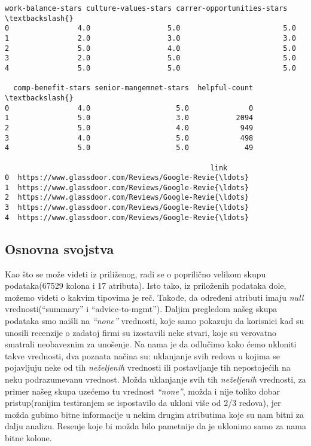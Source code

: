 \documentclass[11pt]{article}
\begin{document}
\begin{tcolorbox}[breakable, size=fbox, boxrule=.5pt, pad at break*=1mm, opacityfill=0]
\begin{Verbatim}[commandchars=\\\{\}]
  work-balance-stars culture-values-stars carrer-opportunities-stars  \textbackslash{}
0                4.0                  5.0                        5.0
1                2.0                  3.0                        3.0
2                5.0                  4.0                        5.0
3                2.0                  5.0                        5.0
4                5.0                  5.0                        5.0

  comp-benefit-stars senior-mangemnet-stars  helpful-count  \textbackslash{}
0                4.0                    5.0              0
1                5.0                    3.0           2094
2                5.0                    4.0            949
3                4.0                    5.0            498
4                5.0                    5.0             49

                                                link
0  https://www.glassdoor.com/Reviews/Google-Revie{\ldots}
1  https://www.glassdoor.com/Reviews/Google-Revie{\ldots}
2  https://www.glassdoor.com/Reviews/Google-Revie{\ldots}
3  https://www.glassdoor.com/Reviews/Google-Revie{\ldots}
4  https://www.glassdoor.com/Reviews/Google-Revie{\ldots}
\end{Verbatim}
\end{tcolorbox}
        
    \hypertarget{osnovna-svojstva}{%
\subsection{Osnovna svojstva }\label{osnovna-svojstva}}

Kao što se može videti iz priliženog, radi se o poprilično velikom skupu
podataka(67529 kolona i 17 atributa). Isto tako, iz priloženih podataka
dole, možemo videti o kakvim tipovima je reč. Takođe, da određeni
atributi imaju \emph{null} vrednosti(``summary'' i ``advice-to-mgmt'').
Daljim pregledom našeg skupa podataka smo naišli na \emph{``none''}
vrednosti, koje samo pokazuju da korisnici kad su unosili recenzije o
zadatoj firmi su izostavili neke stvari, koje su verovatno smatrali
neobaveznim za unošenje. Na nama je da odlučimo kako ćemo ukloniti takve
vrednosti, dva poznata načina su: uklanjanje svih redova u kojima se
pojavljuju neke od tih \emph{neželjenih} vrednosti ili postavljanje tih
nepostojećih na neku podrazumevanu vrednost. Možda uklanjanje svih tih
\emph{neželjenih} vrednosti, za primer našeg skupa uzećemo tu vrednost
\emph{``none''}, možda i nije toliko dobar pristup(ranijim testiranjem
se ispostavilo da ukloni više od 2/3 redova), jer možda gubimo bitne
informacije u nekim drugim atributima koje su nam bitni za dalju
analizu. Resenje koje bi možda bilo pametnije da je uklonimo samo za
nama bitne kolone.
\end{document}
